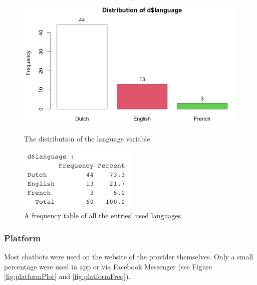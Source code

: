 \begin{figure}[!htb]
	\includegraphics[width=\linewidth]{../LaTeX/Figures/Environments/LanguagePlot.png}
	\caption{The distribution of the language variable.}\label{fig:languagePlot}
	\endminipage\hfill
	\includegraphics[width=\linewidth]{../LaTeX/Figures/Environments/LanguageFreq.png}
	\caption{A frequency table of all the entries' used languages.}\label{fig:languageFreq}
	\endminipage\hfill
\end{figure}

\subsubsection{Platform}
Most chatbots were used on the website of the provider themselves. Only a small percentage were used in app or via Facebook Messenger (see Figure \ref{fig:platformPlot} and \ref{fig:platformFreq}).

